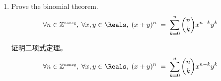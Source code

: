 \begin{enumerate}
    \wbvfill
    
    \item Prove the binomial theorem.
    \[ \forall n \in \Naturals, \; \forall x,y \in \Reals, \; 
    (x+y)^n \; = \; \sum_{k=0}^n \binom{n}{k} x^{n-k}y^k \]
    
    \noindent 证明二项式定理。
    \[ \forall n \in \Naturals, \; \forall x,y \in \Reals, \; 
    (x+y)^n \; = \; \sum_{k=0}^n \binom{n}{k} x^{n-k}y^k \]
    
    \wbvfill
    
    \workbookpagebreak
    
    \end{enumerate}
    
